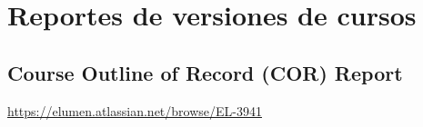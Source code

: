 \section{Reportes de versiones de cursos}
\subsection{Course Outline of Record (COR) Report}
\url{https://elumen.atlassian.net/browse/EL-3941}